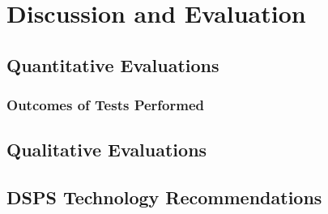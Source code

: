 \section{Discussion and Evaluation}
\label{sec:evaluation}

\subsection{Quantitative Evaluations} %
\label{sub:quantitative_evaluations}

\subsubsection{Outcomes of Tests Performed} %
\label{sub:outcomes_of_tests_performed}




\subsection{Qualitative Evaluations} %
\label{sub:qualitative_evaluations}




\subsection{DSPS Technology Recommendations} %
\label{sub:dsps_technology_recommendations}

